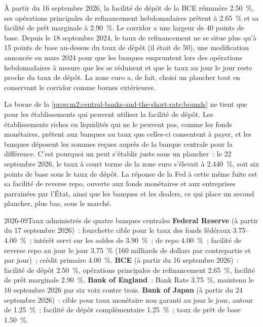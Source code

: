 \begin{example}\label{ex:m2:central-banks-and-the-short-rate:ecb}
À partir du 16 septembre 2026, la facilité de dépôt de la BCE rémunère 2.50~\%, ses
opérations principales de refinancement hebdomadaires prêtent à 2.65~\% et sa facilité de prêt marginale
à 2.90~\%. Le corridor a une largeur de 40 points de base. Depuis le 18 septembre 2024, le
taux de refinancement ne se situe plus qu'à 15 points de base au-dessus du taux de dépôt (il
était de 50), une modification annoncée en mars 2024 pour que les banques empruntent lors des
opérations hebdomadaires à mesure que les  se réduisent et que le taux au jour le jour reste proche
du taux de dépôt. La zone euro a, de fait, choisi un plancher tout en
conservant le corridor comme bornes extérieures.
\end{example}

\begin{remark}\label{rem:m2:central-banks-and-the-short-rate:below}
La borne de la \cref{prop:m2:central-banks-and-the-short-rate:bounds} ne tient que
pour les établissements qui peuvent utiliser la facilité de dépôt. Les établissements riches en liquidités
qui ne le peuvent pas, comme les fonds monétaires, prêtent aux banques au taux que
celles-ci consentent à payer, et les banques déposent les sommes reçues auprès de la banque centrale pour la
différence. C'est pourquoi un  peut s'établir juste sous un plancher~:
le 22 septembre 2026, le taux à court terme de la zone euro s'élevait à 2.440~\%, soit six points de base
sous le taux de dépôt. La réponse de la Fed à cette même fuite est sa facilité de reverse repo,
ouverte aux fonds monétaires et aux entreprises parrainées par l'État, ainsi
que les banques et les dealers, ce qui place un second plancher, plus bas, sous le marché.
\end{remark}

\begin{dated}{2026-09}{Taux administrés de quatre banques centrales}\label{dat:m2:central-banks-and-the-short-rate:rates}
\textbf{Federal Reserve} (à partir du 17 septembre 2026)~: fourchette cible pour le
taux des fonds fédéraux 3.75--4.00~\%~; intérêt servi sur les soldes de  3.90~\%~;
 de repo 4.00~\%~; facilité de reverse repo au jour le jour 3.75~\% (160
milliards de dollars par contrepartie et par jour)~; crédit primaire 4.00~\%.
\textbf{BCE} (à partir du 16 septembre 2026)~: facilité de dépôt 2.50~\%, opérations principales de
refinancement 2.65~\%, facilité de prêt marginale 2.90~\%.
\textbf{Bank of England}~: Bank Rate 3.75~\%, maintenu le 16 septembre 2026 par six
voix contre trois. \textbf{Bank of Japan} (à partir du 24 septembre 2026)~: cible pour
taux monétaire non garanti au jour le jour, autour de 1.25~\%~; facilité de dépôt
complémentaire 1.25~\%~; taux de prêt de base 1.50~\%.
\end{dated}


